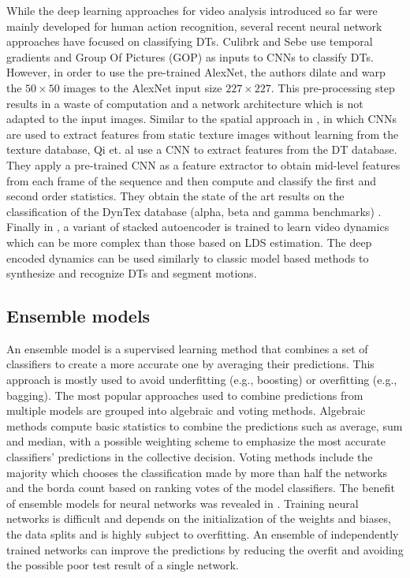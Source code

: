 \documentclass[a4paper,11pt]{article}
\begin{document}
While the deep learning approaches for video analysis introduced so far were mainly developed for human action recognition, several recent neural network approaches have focused on classifying DTs.
Culibrk and Sebe \cite{culibrk2014temporal} use temporal gradients and Group Of Pictures (GOP)
as inputs to CNNs to classify DTs. However, in order to use the pre-trained AlexNet, the authors dilate and warp the $50\times 50$ images to the AlexNet input size $227\times 227$.
This pre-processing step results in a waste of computation and a network architecture which is not adapted to the input images.
Similar to the spatial approach in \cite{cimpoi2014deep}, in which CNNs are used to extract features from static texture images without learning from the texture database, Qi et. al 
\cite{qi2016dynamic} use a CNN to extract features from the DT database. They apply a pre-trained CNN as a feature extractor to obtain mid-level features from each
frame of the sequence and then compute and classify the first and second order statistics. They obtain the state of the art results on the classification of the DynTex database
(alpha, beta and gamma benchmarks) \cite{peteri2010dyntex}.
Finally in \cite{yan2014modeling}, a variant of stacked autoencoder is trained to learn video dynamics which can be more complex than those based on LDS estimation.
The deep encoded dynamics can be used similarly to classic model based methods to synthesize and recognize DTs and segment motions.

\subsection{Ensemble models}
An ensemble model is a supervised learning method that combines a set of classifiers to create a more accurate one by averaging their predictions.
This approach is mostly used to avoid underfitting (e.g., boosting) or overfitting (e.g., bagging).
The most popular approaches used to combine predictions from multiple models are grouped into algebraic and voting methods.
Algebraic methods compute basic statistics to combine the predictions such as average, sum and median, with a possible weighting scheme to emphasize the most accurate classifiers' predictions in the collective decision.
Voting methods include the majority which chooses the classification made by more than half the networks and the borda count \cite{ho1994decision} based on ranking votes of the model classifiers.
The benefit of ensemble models for neural networks was revealed in \cite{hansen1990neural}.
Training neural networks is difficult and depends on the initialization of the weights and biases, the data splits and is highly subject to overfitting.
An ensemble of independently trained networks can improve the predictions by reducing the overfit and avoiding the possible poor test result of a single network.
\end{document}
